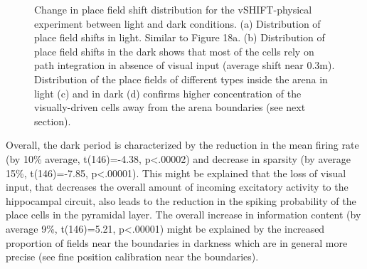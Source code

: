 \begin{figure}
\captionsetup{format=plain}
\caption[Place fields in light and in dark]{
Change in place field shift distribution for the vSHIFT-physical experiment between light and dark conditions. (a) Distribution of place field shifts in light. Similar to Figure 18a. (b) Distribution of place field shifts in the dark shows that most of the cells rely on path integration in absence of visual input (average shift near 0.3m). Distribution of the place fields of different types inside the arena in light (c) and in dark (d) confirms higher concentration of the visually-driven cells away from the arena boundaries (see next section).
}
\label{fig:F20_light_versus_dark}
\end{figure}

Overall, the dark period is characterized by the reduction in the mean firing rate (by 10\% average, t(146)=-4.38, p<.00002) and decrease in sparsity (by average 15\%, t(146)=-7.85, p<.00001). This might be explained that the loss of visual input, that decreases the overall amount of incoming excitatory activity to the hippocampal circuit, also leads to the reduction in the spiking probability of the place cells in the pyramidal layer. The overall increase in information content (by average 9\%, t(146)=5.21, p<.00001) might be explained by the increased proportion of fields near the boundaries in darkness which are in general more precise (see fine position calibration near the boundaries).

